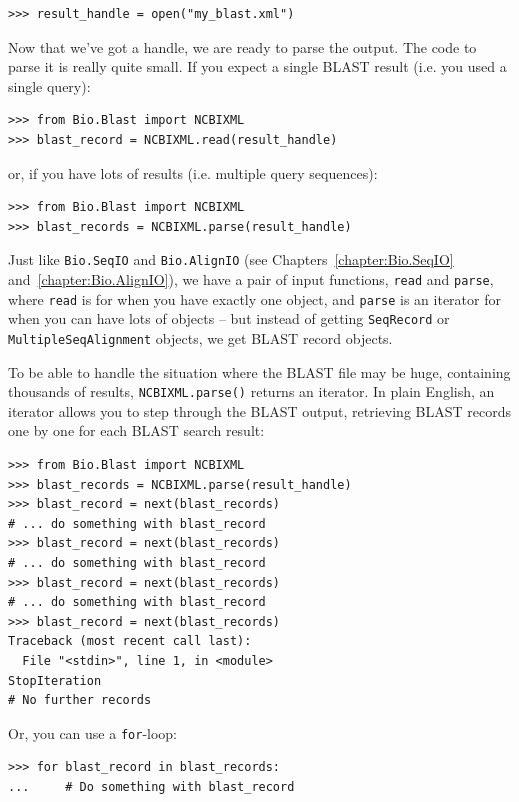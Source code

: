 \documentclass{report}
\begin{document}
\begin{verbatim}
>>> result_handle = open("my_blast.xml")
\end{verbatim}

Now that we've got a handle, we are ready to parse the output. The
code to parse it is really quite small.  If you expect a single
BLAST result (i.e. you used a single query):

\begin{verbatim}
>>> from Bio.Blast import NCBIXML
>>> blast_record = NCBIXML.read(result_handle)
\end{verbatim}

\noindent or, if you have lots of results (i.e. multiple query sequences):

\begin{verbatim}
>>> from Bio.Blast import NCBIXML
>>> blast_records = NCBIXML.parse(result_handle)
\end{verbatim}

Just like \verb|Bio.SeqIO| and \verb|Bio.AlignIO|
(see Chapters~\ref{chapter:Bio.SeqIO} and~\ref{chapter:Bio.AlignIO}),
we have a pair of input functions, \verb|read| and \verb|parse|, where
\verb|read| is for when you have exactly one object, and \verb|parse|
is an iterator for when you can have lots of objects -- but instead of
getting \verb|SeqRecord| or \verb|MultipleSeqAlignment| objects, we
get BLAST record objects.

To be able to handle the situation where the BLAST file may be huge,
containing thousands of results, \verb|NCBIXML.parse()| returns an
iterator. In plain English, an iterator allows you to step through
the BLAST output, retrieving BLAST records one by one for each BLAST
search result:

\begin{verbatim}
>>> from Bio.Blast import NCBIXML
>>> blast_records = NCBIXML.parse(result_handle)
>>> blast_record = next(blast_records)
# ... do something with blast_record
>>> blast_record = next(blast_records)
# ... do something with blast_record
>>> blast_record = next(blast_records)
# ... do something with blast_record
>>> blast_record = next(blast_records)
Traceback (most recent call last):
  File "<stdin>", line 1, in <module>
StopIteration
# No further records
\end{verbatim}

Or, you can use a \verb|for|-loop:
\begin{verbatim}
>>> for blast_record in blast_records:
...     # Do something with blast_record
\end{verbatim}
\end{document}
